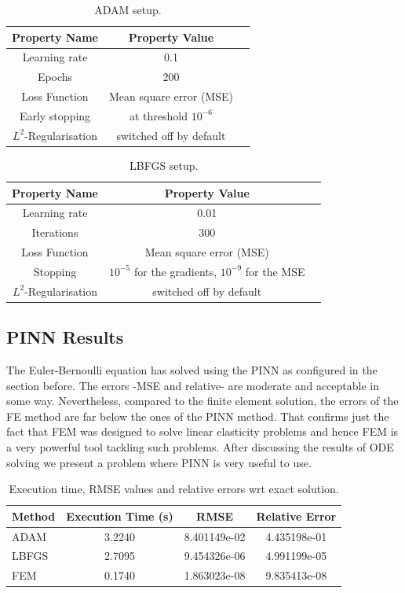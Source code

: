 \documentclass[a4paper,11pt]{article}
\begin{document}
\begin{table}[htbp]
\centering
\begin{tabular}{ccl}
\toprule
\textbf{Property Name} & \textbf{Property Value}\\
\midrule
Learning rate & 0.1\\
Epochs & 200 \\
Loss Function & Mean square error (MSE) \\
Early stopping & at threshold $10^{-6} $ \\
$L^2$-Regularisation & switched off by default \\
\bottomrule
\end{tabular}
\caption{ADAM setup.}
\end{table}

\begin{table}[h!]
\centering
\begin{tabular}{ccl}
\toprule
\textbf{Property Name} & \textbf{Property Value}\\
\midrule
Learning rate & 0.01\\
Iterations & 300 \\
Loss Function & Mean square error (MSE) \\
Stopping & $10^{-5} $ for the gradients, $10^{-9} $ for the MSE\\
$L^2$-Regularisation & switched off by default \\
\bottomrule
\end{tabular}
\caption{LBFGS setup.}
\end{table}

\subsection*{PINN Results}
The Euler-Bernoulli equation has solved using the PINN as configured in the section before. The errors -MSE and relative- are moderate and acceptable in some way. Nevertheless, compared to the finite element solution, the errors of the FE method are far below the ones of the PINN method. That confirms just the fact that FEM was designed to solve linear elasticity problems and hence FEM is a very powerful tool tackling such problems. After discussing the results of ODE solving we present a problem where PINN is very useful to use.

\begin{table}[h!]
\centering
\begin{tabular}{lccc}
\toprule
\textbf{Method} & \textbf{Execution Time (s)} & \textbf{RMSE} & \textbf{Relative Error} \\
\midrule
ADAM & 3.2240 & 8.401149e-02 & 4.435198e-01 \\
LBFGS & 2.7095 & 9.454326e-06 & 4.991199e-05 \\
FEM  & 0.1740   & 1.863023e-08 & 9.835413e-08 \\
\bottomrule
\end{tabular}
\caption{Execution time, RMSE values and relative errors wrt exact solution.}
\end{table}
\end{document}
